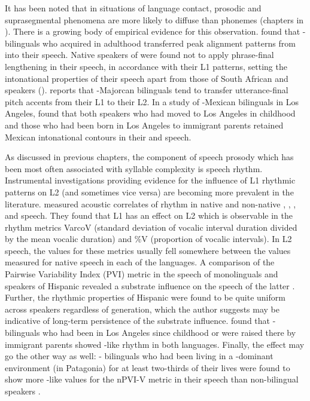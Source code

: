   It has been noted that in situations of language contact, prosodic and suprasegmental phenomena are more likely to diffuse than phonemes (chapters in \citealt{AikhenvaldDixon2001b}). There is a growing body of empirical evidence for this observation. \citet{Mennen2004} found that - bilinguals who acquired  in adulthood transferred peak alignment patterns from  into their  speech. Native speakers of  were found not to apply phrase-final lengthening in their  speech, in accordance with their L1 patterns, setting the intonational properties of their speech apart from those of South African  and   speakers (\citealt{CoetzeeWissing2007}). \citet{Simonet2011} reports that -Majorcan  bilinguals tend to transfer utterance-final pitch accents from their L1 to their L2. In a study of -Mexican  bilinguals in Los Angeles, \citet{Robles-Puente2014} found that both speakers who had moved to Los Angeles in childhood and those who had been born in Los Angeles to immigrant parents retained Mexican  intonational contours in their  and  speech.

  As discussed in previous chapters, the component of speech prosody which has been most often associated with syllable complexity is speech rhythm. Instrumental investigations providing evidence for the influence of L1 rhythmic patterns on L2 (and sometimes vice versa) are becoming more prevalent in the literature. \citet{WhiteMattys2007} measured acoustic correlates of rhythm in native and non-native , , , and  speech. They found that L1 has an effect on L2 which is observable in the rhythm metrics VarcoV (standard deviation of vocalic interval duration divided by the mean vocalic duration) and \%V (proportion of vocalic intervals). In L2 speech, the values for these metrics usually fell somewhere between the values measured for native speech in each of the languages. A comparison of the Pairwise Variability Index (PVI) metric in the speech of  monolinguals and speakers of Hispanic  revealed a  substrate influence on the speech of the latter \citep{Carter2005}. Further, the rhythmic properties of Hispanic  were found to be quite uniform across speakers regardless of generation, which the author suggests may be indicative of long-term persistence of  the substrate influence. \citet{Robles-Puente2014} found that - bilinguals who had been in Los Angeles since childhood or were raised there by immigrant parents showed -like rhythm in both languages. Finally, the effect may go the other way as well: - bilinguals who had been living in a -dominant environment (in Patagonia) for at least two-thirds of their lives were found to show more -like values for the nPVI-V metric in their  speech than non-bilingual  speakers \citep{CoetzeeEtAl2015}. 

